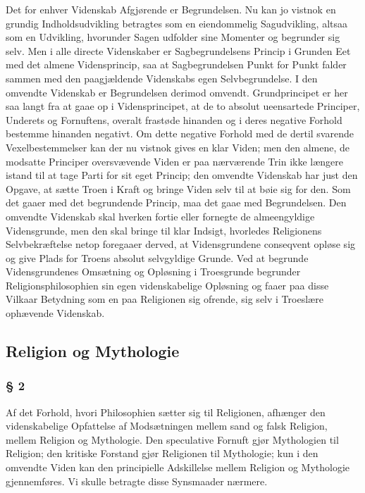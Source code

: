 \documentclass[12pt,a4paper]{article}
\begin{document}
Det for enhver Videnskab Afgjørende er Begrundelsen. Nu kan jo
vistnok en grundig Indholdsudvikling betragtes som en
eiendommelig Sagudvikling, altsaa som en Udvikling, hvorunder
Sagen udfolder sine Momenter og begrunder sig selv. Men i alle
directe Videnskaber er Sagbegrundelsens Princip i Grunden Eet
med det almene Vidensprincip, saa at Sagbegrundelsen Punkt for
Punkt falder sammen med den paagjældende Videnskabs egen
Selvbegrundelse. I den omvendte Videnskab er Begrundelsen
derimod omvendt. Grundprincipet er her saa langt fra at gaae op
i Vidensprincipet, at de to absolut ueensartede Principer,
Underets og Fornuftens, overalt frastøde hinanden og i deres
negative Forhold bestemme hinanden negativt. Om dette negative
Forhold med de dertil svarende Vexelbestemmelser kan der nu
vistnok gives en klar Viden; men den almene, de modsatte
Principer oversvævende Viden er paa nærværende Trin ikke
længere istand til at tage Parti for sit eget Princip; den
omvendte Videnskab har just den Opgave, at sætte Troen i Kraft
og bringe Viden selv til at bøie sig for den. Som det gaaer med
det begrundende Princip, maa det gaae med Begrundelsen. Den
omvendte Videnskab skal hverken fortie eller fornegte de
almeengyldige Vidensgrunde, men den skal bringe til klar
Indsigt, hvorledes Religionens Selvbekræftelse netop foregaaer
derved, at Vidensgrundene conseqvent opløse sig og give Plads
for Troens absolut selvgyldige Grunde. Ved at begrunde
Vidensgrundenes Omsætning og Opløsning i Troesgrunde begrunder
Religionsphilosophien sin egen videnskabelige Opløsning og faaer
paa disse Vilkaar Betydning som en paa Religionen sig ofrende,
sig selv i Troeslære ophævende Videnskab.

\subsection*{Religion og Mythologie}
\subsubsection*{§ 2}

Af det Forhold, hvori Philosophien sætter sig til Religionen,
afhænger den videnskabelige Opfattelse af Modsætningen mellem
sand og falsk Religion, mellem Religion og Mythologie. Den
speculative Fornuft gjør Mythologien til Religion; den kritiske
Forstand gjør Religionen til Mythologie; kun i den omvendte
Viden kan den principielle Adskillelse mellem Religion og
Mythologie gjennemføres. Vi skulle betragte disse Synsmaader
nærmere.
\end{document}
